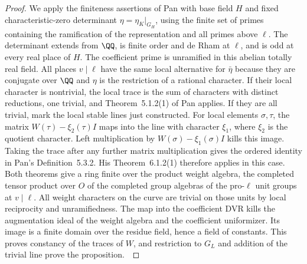 \documentclass[a4paper,11pt]{article}
\theoremstyle{definition}
\theoremstyle{remark}
\numberwithin{equation}{section}
\begin{document}
\begin{proof}
We apply the finiteness assertions of Pan with base field \(H\)
and fixed characteristic-zero determinant
\(\eta=\eta_K|_{G_H}\), using the finite set of primes containing
the ramification of the representation and all primes above
\(\ell\). The determinant extends from \(\QQ\), is finite order
and de Rham at \(\ell\), and is odd at every real place of \(H\).
The coefficient prime is unramified in this abelian totally real
field. All places \(v\mid\ell\) have the same local alternative
for \(\bar\eta\) because they are conjugate over \(\QQ\) and \(\eta\)
is the restriction of a rational character. If their local
character is nontrivial, the local trace is the sum of characters
with distinct reductions, one trivial, and Theorem~5.1.2(1)
of Pan applies. If they are all trivial, mark the local stable
lines just constructed. For local elements \(\sigma,\tau\), the
matrix \(W(\tau)-\xi_2(\tau)I\) maps into the line with character
\(\xi_1\), where \(\xi_2\) is the quotient character. Left
multiplication by \(W(\sigma)-\xi_1(\sigma)I\) kills this image.
Taking the trace after any further matrix multiplication gives
the ordered identity in Pan's Definition~5.3.2. His
Theorem~6.1.2(1) therefore applies in this case.
Both theorems give a ring finite over the product weight algebra,
the completed tensor product over \(O\) of the completed group
algebras of the pro-\(\ell\) unit groups at \(v\mid\ell\).
All weight characters on the curve are trivial on those units by
local reciprocity and unramifiedness. The map into the coefficient
DVR kills the augmentation ideal of the weight algebra and the
coefficient uniformizer. Its image is a finite domain over the
residue field, hence a field of constants. This proves constancy
of the traces of \(W\), and restriction to \(G_L\) and addition
of the trivial line prove the proposition.~\cite{XI-VIII-VI-pan40}
\end{proof}
\end{document}
